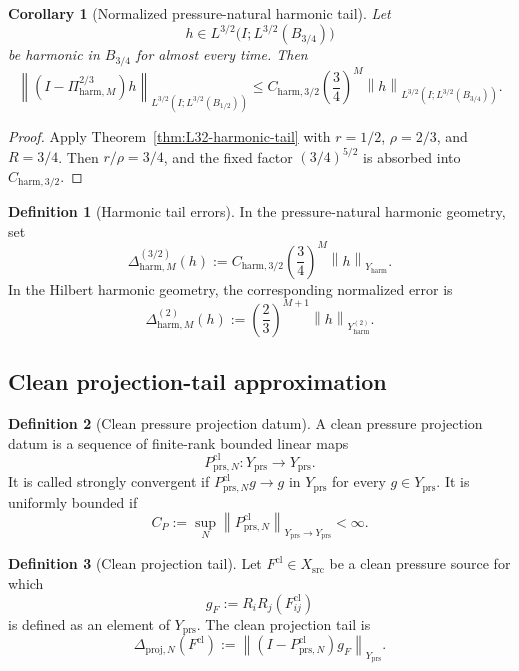 \documentclass[11pt]{article}
\numberwithin{equation}{section}
\newtheorem{corollary}[corollary]{Corollary}
\theoremstyle{definition}
\newtheorem{definition}[definition]{Definition}
\theoremstyle{remark}
\newcommand{\prs}{\mathrm{prs}}
\newcommand{\proj}{\mathrm{proj}}
\newcommand{\harm}{\mathrm{harm}}
\newcommand{\src}{\mathrm{src}}
\newcommand{\cl}{\mathrm{cl}}
\newcommand{\norm}[2]{\left\|#1\right\|_{#2}}
\begin{document}
\begin{corollary}[Normalized pressure-natural harmonic tail]\label{cor:normalized-L32-harmonic-tail}
Let
\[
        h\in L^{3/2}\bigl(I;L^{3/2}(B_{3/4})\bigr)
\]
be harmonic in $B_{3/4}$ for almost every time.  Then
\begin{equation}\label{eq:normalized-L32-harmonic-tail}
\norm{(I-\Pi^{2/3}_{\harm,M})h}{L^{3/2}(I;L^{3/2}(B_{1/2}))}
\le
C_{\harm,3/2}\left(\frac34\right)^M
\norm{h}{L^{3/2}(I;L^{3/2}(B_{3/4}))}.
\end{equation}
\end{corollary}

\begin{proof}
Apply Theorem~\ref{thm:L32-harmonic-tail} with $r=1/2$, $\rho=2/3$, and $R=3/4$.  Then
$r/\rho=3/4$, and the fixed factor $(3/4)^{5/2}$ is absorbed into $C_{\harm,3/2}$.
\end{proof}

\begin{definition}[Harmonic tail errors]\label{def:harmonic-tail-errors}
In the pressure-natural harmonic geometry, set
\begin{equation}\label{eq:L32-harmonic-error}
\Delta^{(3/2)}_{\harm,M}(h)
:=
C_{\harm,3/2}\left(\frac34\right)^M
\norm{h}{Y_{\harm}}.
\end{equation}
In the Hilbert harmonic geometry, the corresponding normalized error is
\[
\Delta^{(2)}_{\harm,M}(h)
:=
\left(\frac23\right)^{M+1}
\norm{h}{Y^{(2)}_{\harm}}.
\]
\end{definition}

\subsection{Clean projection-tail approximation}
\label{sec:projection-tail}

\begin{definition}[Clean pressure projection datum]\label{def:clean-pressure-projection}
A clean pressure projection datum is a sequence of finite-rank bounded linear maps
\[
        P^{\cl}_{\prs,N}:Y_{\prs}\to Y_{\prs}.
\]
It is called strongly convergent if $P^{\cl}_{\prs,N}g\to g$ in $Y_{\prs}$ for every
$g\in Y_{\prs}$.  It is uniformly bounded if
\[
        C_P:=\sup_N\norm{P^{\cl}_{\prs,N}}{Y_{\prs}\to Y_{\prs}}<\infty.
\]
\end{definition}

\begin{definition}[Clean projection tail]\label{def:clean-projection-tail}
Let $F^{\cl}\in X_{\src}$ be a clean pressure source for which
\[
        g_F:=R_iR_j(F^{\cl}_{ij})
\]
is defined as an element of $Y_{\prs}$.  The clean projection tail is
\[
        \Delta_{\proj,N}(F^{\cl})
        :=
        \norm{(I-P^{\cl}_{\prs,N})g_F}{Y_{\prs}}.
\]
\end{definition}
\end{document}

